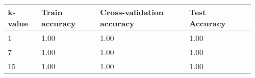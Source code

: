 \def\arraystretch{1.25}
\begin{center}
\begin{longtable}{l l l l l}
\hline
\hline
\textbf{k-value} & \textbf{Train accuracy} & \textbf{Cross-validation accuracy} & \textbf{Test Accuracy}\\
\hline
\hline
1 & 1.00 & 1.00 & 1.00 \\
7 & 1.00 & 1.00 & 1.00 \\
15 & 1.00 & 1.00 & 1.00 \\

\hline
\end{longtable}
\setcounter{table}{0}
\end{center}